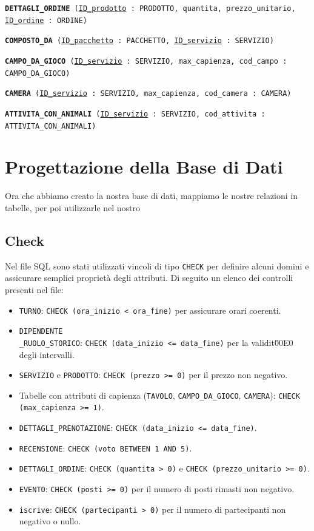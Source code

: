 \documentclass[a4paper,12pt]{report}
\begin{document}
\begin{description}
	\item\texttt{\textbf{DETTAGLI\_ORDINE} (\underline{ID\_prodotto} : PRODOTTO, quantita, prezzo\_unitario, \newline \underline{ID\_ordine} : ORDINE)}
	\item\texttt{\textbf{COMPOSTO\_DA} (\underline{ID\_pacchetto} : PACCHETTO, \underline{ID\_servizio} : SERVIZIO)}
	\item\texttt{\textbf{CAMPO\_DA\_GIOCO} (\underline{ID\_servizio} : SERVIZIO, max\_capienza, \newline cod\_campo : CAMPO\_DA\_GIOCO)}
	\item\texttt{\textbf{CAMERA} (\underline{ID\_servizio} : SERVIZIO, max\_capienza, cod\_camera : CAMERA)}
	\item\texttt{\textbf{ATTIVITA\_CON\_ANIMALI} (\underline{ID\_servizio} : SERVIZIO, \newline cod\_attivita : ATTIVITA\_CON\_ANIMALI)}
\end{description}

\chapter{Progettazione della Base di Dati}
Ora che abbiamo creato la nostra base di dati, mappiamo le nostre relazioni in tabelle, per poi utilizzarle nel nostro

\section{Check}
Nel file SQL sono stati utilizzati vincoli di tipo \texttt{CHECK} per definire alcuni domini e assicurare semplici proprietà degli attributi. Di seguito un elenco dei controlli presenti nel file:
\begin{itemize}
	\item \texttt{TURNO}: \texttt{CHECK (ora\_inizio < ora\_fine)} per assicurare orari coerenti.
	\item \texttt{DIPENDENTE\\\_RUOLO\_STORICO}: \texttt{CHECK (data\_inizio <= data\_fine)} per la validit\u00E0 degli intervalli.
	\item \texttt{SERVIZIO} e \texttt{PRODOTTO}: \texttt{CHECK (prezzo >= 0)} per il prezzo non negativo.
	\item Tabelle con attributi di capienza (\texttt{TAVOLO}, \texttt{CAMPO\_DA\_GIOCO}, \newline \texttt{CAMERA}): \texttt{CHECK (max\_capienza >= 1)}.
	\item \texttt{DETTAGLI\_PRENOTAZIONE}: \texttt{CHECK (data\_inizio <= data\_fine)}.
	\item \texttt{RECENSIONE}: \texttt{CHECK (voto BETWEEN 1 AND 5)}.
	\item \texttt{DETTAGLI\_ORDINE}: \texttt{CHECK (quantita > 0)} e \texttt{CHECK (prezzo\_unitario >= 0)}.
	\item \texttt{EVENTO}: \texttt{CHECK (posti >= 0)} per il numero di posti rimasti non negativo.
	\item \texttt{iscrive}: \texttt{CHECK (partecipanti > 0)} per il numero di partecipanti non negativo o nullo.
\end{itemize}
\end{document}
